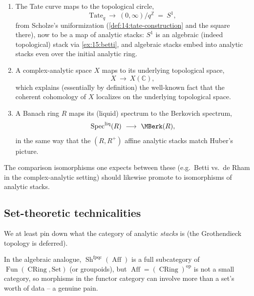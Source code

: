 \begin{remark}
\label{rmk:15:relations}
\begin{enumerate}
\item The Tate curve maps to the topological circle,
\begin{equation*}
\mathrm{Tate}_q\ \longrightarrow\ (0,\infty)/q^{\mathbb{Z}}\ =\ S^1,
\end{equation*}
from Scholze's uniformization (\cref{def:14:tate-construction} and the square there),
now to be a map of analytic stacks: $S^1$ is an algebraic (indeed topological) stack
via \cref{ex:15:betti}, and algebraic stacks embed into analytic stacks even over the
initial analytic ring.
\item A complex-analytic space $X$ maps to its underlying topological space,
\begin{equation*}
X\ \longrightarrow\ X(\mathbb{C}),
\end{equation*}
which explains (essentially by definition) the well-known fact that the coherent
cohomology of $X$ localizes on the underlying topological space.
\item A Banach ring $R$ maps its (liquid) spectrum to the Berkovich spectrum,
\begin{equation*}
\operatorname{Spec}^{\mathrm{liq}}(R)\ \longrightarrow\ \MBerk(R),
\end{equation*}
in the same way that the $(R,R^+)$ affine analytic stacks match Huber's picture.
\end{enumerate}
The comparison isomorphisms one expects between these (e.g.\ Betti vs.\ de Rham in the
complex-analytic setting) should likewise promote to isomorphisms of analytic stacks.
\end{remark}

\subsection{Set-theoretic technicalities}
\label{subsec:15:set-theory}

We at least pin down what the category of analytic \emph{stacks} is (the Grothendieck
topology is deferred).

\begin{remark}
\label{rmk:15:set-theory-problem}
In the algebraic analogue, $\operatorname{Sh}^{\mathrm{fpqc}}(\operatorname{Aff})$ is a
full subcategory of $\operatorname{Fun}(\operatorname{CRing}, \mathrm{Set})$ (or
groupoids), but $\operatorname{Aff} = (\operatorname{CRing})^{\mathrm{op}}$ is not a
small category, so morphisms in the functor category can involve more than a set's
worth of data -- a genuine pain.
\end{remark}

